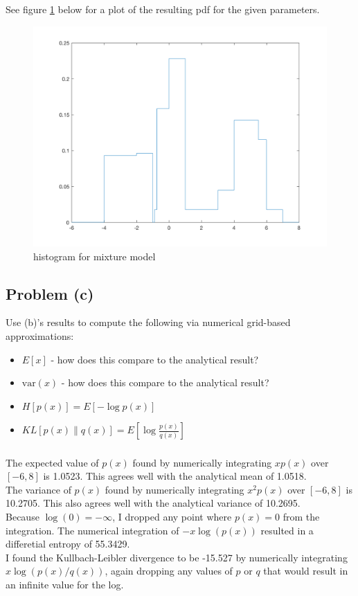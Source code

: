 \documentclass[11pt]{article}
\begin{document}
\subparagraph*{}
See figure \ref{AQ2_plot1} below for a plot of the resulting pdf for the given parameters.
\begin{figure}[h!]
	\centering
	\includegraphics[width=0.6\linewidth]{AQ2_plot1.png}
	\caption{histogram for mixture model}
	\label{AQ2_plot1}
\end{figure}

\subsection*{Problem (c)}
Use (b)'s results to compute the following via numerical grid-based approximations:
\begin{itemize}
	\item $E[x]$ - how does this compare to the analytical result?
	\item $\text{var}(x)$ - how does this compare to the analytical result?
	\item $H[p(x)]=E[-\log p(x)]$
	\item $KL[p(x)\|q(x)] = E[\log\frac{p(x)}{q(x)}]$
\end{itemize}

\subparagraph*{}
The expected value of $p(x)$ found by numerically integrating $xp(x)$ over $[-6,8]$ is 1.0523. This agrees well with the analytical mean of 1.0518. \\
The variance of $p(x)$ found by numerically integrating $x^2p(x)$ over $[-6,8]$ is 10.2705. This also agrees well with the analytical variance of 10.2695. \\
Because $\log(0)=-\infty$, I dropped any point where $p(x)=0$ from the integration. The numerical integration of $-x\log(p(x))$ resulted in a differetial entropy of 55.3429. \\
I found the Kullbach-Leibler divergence to be -15.527 by numerically integrating $x\log(p(x)/q(x))$, again dropping any values of $p$ or $q$ that would result in an infinite value for the log.
\end{document}
